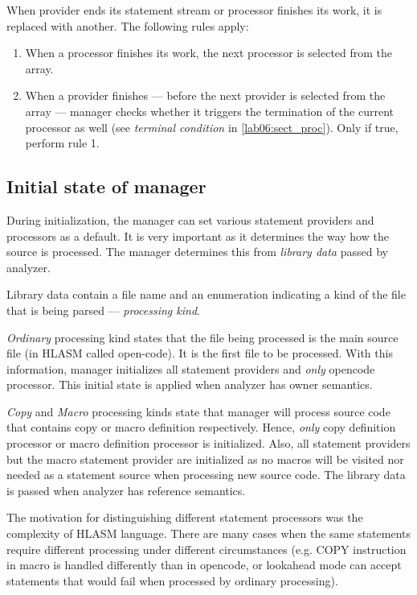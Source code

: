 When provider ends its statement stream or processor finishes its work, it is replaced with another. The following rules apply:

\begin{enumerate}
	\item When a processor finishes its work, the next processor is selected from the array.
	\item When a provider finishes --- before the next provider is selected from the array --- manager checks whether it triggers the termination of the current processor as well (see \emph{terminal condition} in \cref{lab06:sect_proc}). Only if true, perform rule 1.
\end{enumerate}

\subsection{Initial state of manager}
\label{lab06:lib_data}

During initialization, the manager can set various statement providers and processors as a default. It is very important as it determines the way how the source is processed. The manager determines this from \emph{library data} passed by analyzer.

Library data contain a file name and an enumeration indicating a kind of the file that is being parsed --- \emph{processing kind}.

\emph{Ordinary} processing kind states that the file being processed is the main source file (in HLASM called open-code). It is the first file to be processed. With this information, manager initializes all statement providers and \emph{only} opencode processor. This initial state is applied when analyzer has owner semantics.

\emph{Copy} and \emph{Macro} processing kinds state that manager will process source code that contains copy or macro definition respectively. Hence, \emph{only} copy definition processor or macro definition processor is initialized. Also, all statement providers but the macro statement provider are initialized as no macros will be visited nor needed as a statement source when processing new source code. The library data is passed when analyzer has reference semantics.



\label{lab06:sect_proc}

The motivation for distinguishing different statement processors was the complexity of HLASM language. There are many cases when the same statements require different processing under different circumstances (e.g. COPY instruction in macro is handled differently than in opencode, or lookahead mode can accept statements that would fail when processed by ordinary processing).

